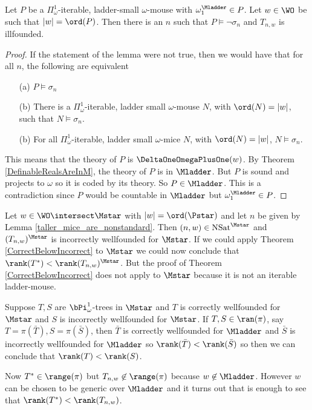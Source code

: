 \documentclass[oneside,12pt]{amsart}
\DeclareMathOperator{\NSat}{NSat}
\begin{document}
\begin{lemma}
\label{taller_mice_are_nonstandard}
Let $P$ be a  $\Pi^1_{\omega}$-iterable,
ladder-small $\omega$-mouse with $\omega_1^{\Mladder}\in P$.
Let $w\in\WO$ be such that $|w|=\ord(P)$.
Then there is an $n$ such that $P\models \neg\sigma_n$ and $T_{n,w}$ is illfounded.
\end{lemma}
\begin{proof}
If the statement of the lemma were not true, then we would have that for all $n$,
the following are equivalent
\begin{enumerate}
\item[(a)] $P\models\sigma_n$
\item[(b)] There is a $\Pi^1_{\omega}$-iterable, ladder small $\omega$-mouse $N$,
with $\ord(N)=|w|$, such that $N\models\sigma_n$.
\item[(b)] For all $\Pi^1_{\omega}$-iterable, ladder small $\omega$-mice $N$,
with $\ord(N)=|w|$, $N\models\sigma_n$.
\end{enumerate}
This means that the theory of $P$ is $\DeltaOneOmegaPlusOne(w)$. By Theorem
\ref{DefinableRealsAreInM}, the theory of $P$ is in $\Mladder$. But $P$ is
sound and projects to $\omega$ so it is coded by its theory. So
$P\in\Mladder$. This is a contradiction since $P$ would be countable in
$\Mladder$ but $\omega_1^{\Mladder}\in P$.
\end{proof}

Let $w\in\WO\intersect\Mstar$ with $|w|=\ord(\Pstar)$ and let
$n$ be given by Lemma \ref{taller_mice_are_nonstandard}. Then
$(n,w)\in \NSat^{\Mstar}$ and
$(T_{n,w})^{\Mstar}$ is incorrectly wellfounded for $\Mstar$. If we could apply
Theorem \ref{CorrectBelowIncorrect} to $\Mstar$ we could now conclude
that $\rank(T^*) < \rank(T_{n,w})^{\Mstar}$. But the proof of
Theorem \ref{CorrectBelowIncorrect} does not apply to $\Mstar$ because it is
not an iterable ladder-mouse.

Suppose $T,S$ are $\bPi^1_{\omega}$-trees in $\Mstar$ and $T$ is correctly wellfounded for $\Mstar$
and $S$ is incorrectly wellfounded for $\Mstar$. If $T,S\in\ran(\pi)$, say
$T=\pi(\bar{T}),S=\pi(\bar{S})$, then $\bar{T}$ is correctly wellfounded for $\Mladder$ and
$\bar{S}$ is incorrectly wellfounded for $\Mladder$ so $\rank(\bar{T})<\rank(\bar{S})$ so
then we can conclude that $\rank(T)<\rank(S)$.

Now $T^*\in\range(\pi)$ but $T_{n,w}\not\in\range(\pi)$ because $w\not\in\Mladder$. However
$w$ can be chosen to be generic over $\Mladder$ and it turns out that is enough to see that
$\rank(T^*)<\rank(T_{n,w})$.
\end{document}
